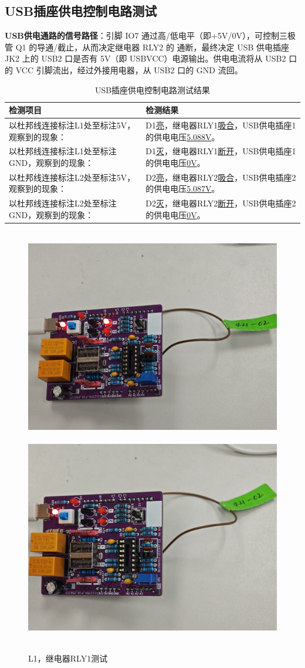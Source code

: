 \subsection{USB插座供电控制电路测试}
\textbf{USB供电通路的信号路径}：引脚 IO7 通过高/低电平（即+5V/0V），可控制三极管 Q1 的导通/截止，从而决定继电器 RLY2 的
通断，最终决定 USB 供电插座 JK2 上的 USB2 口是否有 5V（即 USBVCC）电源输出。供电电流将从
USB2 口的 VCC 引脚流出，经过外接用电器，从 USB2 口的 GND 流回。
\begin{table}[H]
\centering
\caption{USB插座供电控制电路测试结果}
\begin{tabular}{L{.4\textwidth}L{.4\textwidth}}
    \toprule
检测项目  & 检测结果 \\
\midrule
以杜邦线连接标注L1处至标注5V，观察到的现象：   & D1\underline{亮}，继电器RLY1\underline{吸合}，USB供电插座1的供电电压\underline{5.088V}。 \\
以杜邦线连接标注L1处至标注GND，观察到的现象： &    D1\underline{灭}，继电器RLY1\underline{断开}，USB供电插座1的供电电压\underline{0V}。\\
以杜邦线连接标注L2处至标注5V，观察到的现象：  & D2\underline{亮}，继电器RLY2\underline{吸合}，USB供电插座2的供电电压\underline{5.087V}。 \\
以杜邦线连接标注L2处至标注GND，观察到的现象：  &  D2\underline{灭}，继电器RLY2\underline{断开}，USB供电插座2的供电电压\underline{0V}。\\
\bottomrule
\end{tabular}
\end{table}
\begin{figure}[H]
  \centering
  \includegraphics[width=.3\textwidth]{./figures/插座/usb1供电.jpg}
  \includegraphics[width=.3\textwidth]{./figures/插座/usb1断电.jpg}
  \caption{L1，继电器RLY1测试}
\end{figure}
